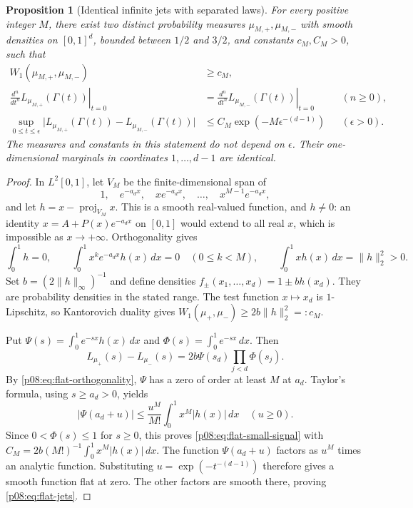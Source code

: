 \documentclass[11pt,letterpaper]{article}
\newtheorem{proposition}[theorem]{Proposition}
\theoremstyle{definition}
\theoremstyle{remark}
\newcommand{\1}{\mathbf 1}
\begin{document}
\begin{proposition}[Identical infinite jets with separated laws]
\label{p08:prop:flat-infinite-jets}
For every positive integer $M$, there exist two distinct probability measures
$\mu_{M,+},\mu_{M,-}$ with smooth densities on $[0,1]^d$, bounded between
$1/2$ and $3/2$, and constants $c_M,C_M>0$, such that
\begin{align}
 W_1(\mu_{M,+},\mu_{M,-})&\geq c_M,\label{p08:eq:flat-w1}\\
 \left.\frac{d^n}{dt^n}L_{\mu_{M,+}}(\Gamma(t))\right|_{t=0}
 &=\left.\frac{d^n}{dt^n}L_{\mu_{M,-}}(\Gamma(t))\right|_{t=0}
 &&(n\geq0),\label{p08:eq:flat-jets}\\
 \sup_{0\leq t\leq\epsilon}
 \big|L_{\mu_{M,+}}(\Gamma(t))-L_{\mu_{M,-}}(\Gamma(t))\big|
 &\leq C_M\exp(-M\epsilon^{-(d-1)})
 &&(\epsilon>0).\label{p08:eq:flat-small-signal}
\end{align}
The measures and constants in this statement do not depend on $\epsilon$.
Their one-dimensional marginals in coordinates $1,\ldots,d-1$ are identical.
\end{proposition}

\begin{proof}
In $L^2[0,1]$, let $V_M$ be the finite-dimensional span of
\[
 1,\quad e^{-a_d x},\quad x e^{-a_d x},\quad\ldots,\quad
 x^{M-1}e^{-a_d x},
\]
and let $h=x-\operatorname{proj}_{V_M}x$.  This is a smooth real-valued
function, and $h\ne0$: an identity
$x=A+P(x)e^{-a_d x}$ on $[0,1]$ would extend to all real $x$, which is
impossible as $x\to+\infty$.  Orthogonality gives
\begin{equation}\label{p08:eq:flat-orthogonality}
 \int_0^1h=0,\qquad
 \int_0^1x^k e^{-a_d x}h(x)\,dx=0\quad(0\leq k<M),\qquad
 \int_0^1x h(x)\,dx=\|h\|_2^2>0.
\end{equation}
Set $b=(2\|h\|_\infty)^{-1}$ and define densities
$f_\pm(x_1,\ldots,x_d)=1\pm b h(x_d)$.  They are probability densities
in the stated range.  The test function $x\mapsto x_d$ is $1$-Lipschitz,
so Kantorovich duality gives
$W_1(\mu_+,\mu_-)\geq2b\|h\|_2^2=:c_M$.

Put
$\Psi(s)=\int_0^1 e^{-sx}h(x)\,dx$ and
$\Phi(s)=\int_0^1e^{-sx}\,dx$.  Then
\[
 L_{\mu_+}(s)-L_{\mu_-}(s)
 =2b\Psi(s_d)\prod_{j<d}\Phi(s_j).
\]
By \eqref{p08:eq:flat-orthogonality}, $\Psi$ has a zero of order at least $M$
at $a_d$.  Taylor's formula, using $s\geq a_d>0$, yields
\[
 |\Psi(a_d+u)|\leq\frac{u^M}{M!}\int_0^1x^M|h(x)|\,dx
 \quad(u\geq0).
\]
Since $0<\Phi(s)\leq1$ for $s\geq0$, this proves
\eqref{p08:eq:flat-small-signal} with
$C_M=2b(M!)^{-1}\int_0^1x^M|h(x)|\,dx$.
The function $\Psi(a_d+u)$ factors as $u^M$ times an analytic function.
Substituting $u=\exp(-t^{-(d-1)})$ therefore gives a smooth function flat
at zero.  The other factors are smooth there, proving
\eqref{p08:eq:flat-jets}.
\end{proof}
\end{document}
